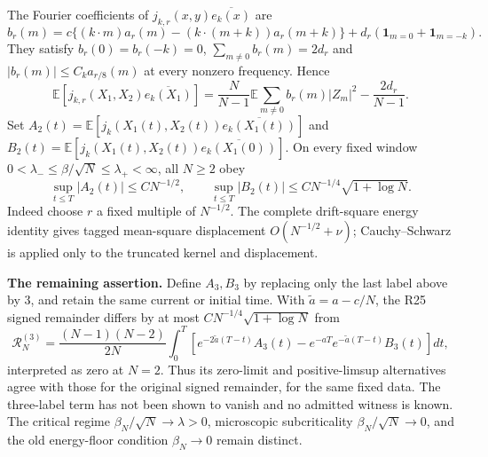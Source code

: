 \documentclass[11pt]{article}
\newcommand{\E}{\mathbb E}
\begin{document}
\newpage
The Fourier coefficients of $j_{k,r}(x,y)\overline{e_k(x)}$ are
\[
 b_r(m)=c\{(k\cdot m)a_r(m)-(k\cdot(m+k))a_r(m+k)\}
              +d_r(\mathbf1_{m=0}+\mathbf1_{m=-k}).
\]
They satisfy $b_r(0)=b_r(-k)=0$, $\sum_{m\ne0}b_r(m)=2d_r$ and
$|b_r(m)|\le C_k a_{r/8}(m)$ at every nonzero frequency. Hence
\[
 \E[j_{k,r}(X_1,X_2)\overline{e_k(X_1)}]
 =\frac N{N-1}\E\sum_{m\ne0}b_r(m)|Z_m|^2-\frac{2d_r}{N-1}.
\]
Set $A_2(t)=\E[j_k(X_1(t),X_2(t))\overline{e_k(X_1(t))}]$ and
$B_2(t)=\E[j_k(X_1(t),X_2(t))\overline{e_k(X_1(0))}]$.
On every fixed window $0<\lambda_-\le\beta/\sqrt N\le\lambda_+<\infty$, all $N\ge2$ obey
\[
 \sup_{t\le T}|A_2(t)|\le C N^{-1/2},\qquad
 \sup_{t\le T}|B_2(t)|\le C N^{-1/4}\sqrt{1+\log N}.
\]
Indeed choose $r$ a fixed multiple of $N^{-1/2}$. The complete drift-square energy identity gives tagged mean-square displacement $O(N^{-1/2}+\nu)$; Cauchy--Schwarz is applied only to the truncated kernel and displacement.

\noindent\textbf{The remaining assertion.}
Define $A_3,B_3$ by replacing only the last label above by $3$, and retain the same current or initial time. With $\widetilde a=a-c/N$, the R25 signed remainder differs by at most $CN^{-1/4}\sqrt{1+\log N}$ from
\[
 \mathcal R_N^{(3)}=\frac{(N-1)(N-2)}{2N}\int_0^T
 \left[e^{-2\widetilde a(T-t)}A_3(t)
       -e^{-aT}e^{-\widetilde a(T-t)}B_3(t)\right]dt,
\]
interpreted as zero at $N=2$. Thus its zero-limit and positive-limsup alternatives agree with those for the original signed remainder, for the same fixed data. The three-label term has not been shown to vanish and no admitted witness is known. The critical regime $\beta_N/\sqrt N\to\lambda>0$, microscopic subcriticality $\beta_N/\sqrt N\to0$, and the old energy-floor condition $\beta_N\to0$ remain distinct.
\end{document}
